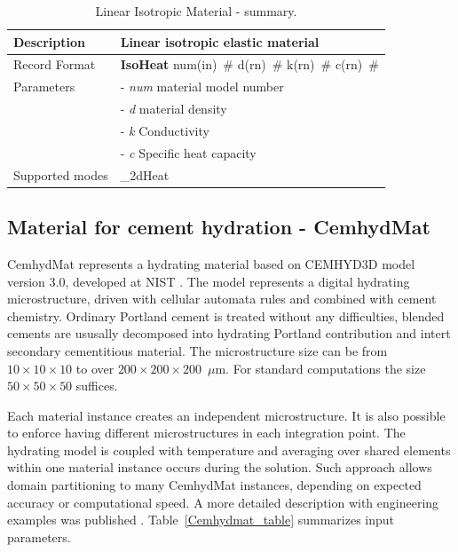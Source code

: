 \documentclass[a4paper]{article}
\newcommand{\descitem}[1]{{\noindent \bf #1}}
\newcommand{\elemparam}[2]{{{#1\tiny (#2)}~\#}}
\newcommand{\param}[1]{{\it #1}}
\begin{document}
\begin{table}[!htb]
\begin{tabular}{|l|p{9cm}|}
\hline
Description & Linear isotropic elastic material\\
\hline
Record Format & \descitem{IsoHeat} \elemparam{num}{in}
\elemparam{d}{rn} \elemparam{k}{rn} \elemparam{c}{rn}\\
Parameters &- \param{num} material model number\\
&- \param{d} material density\\
&- \param{k} Conductivity\\
&- \param{c} Specific heat capacity\\
Supported modes& \_2dHeat\\
\hline
\end{tabular}
\caption{Linear Isotropic Material - summary.}
\label{Isoheat_table}
\end{table}

\subsection{Material for cement hydration - CemhydMat}
\label{Cemhyd}
CemhydMat represents a hydrating material based on CEMHYD3D model version 3.0,
developed at NIST \cite{NISTIR7232}. The model represents a digital hydrating
microstructure, driven with cellular automata rules and combined with cement
chemistry. Ordinary Portland cement is treated without any difficulties, blended
cements are ususally decomposed into hydrating Portland contribution and intert
secondary cementitious material. The microstructure size can be from
$10\times10\times10$ to over $200\times200\times200$~$\mu$m. For standard
computations the size $50\times50\times50$ suffices.

Each material instance creates an independent microstructure. It is also
possible to enforce having different microstructures in each integration point.
The hydrating model is coupled with temperature and averaging over shared
elements within one material instance occurs during the solution. Such approach
allows domain partitioning to many CemhydMat instances, depending on expected
accuracy or computational speed. A more detailed description with engineering
examples was published \cite{Smilauer:09}. Table~\ref{Cemhydmat_table} summarizes input parameters.
\end{document}
